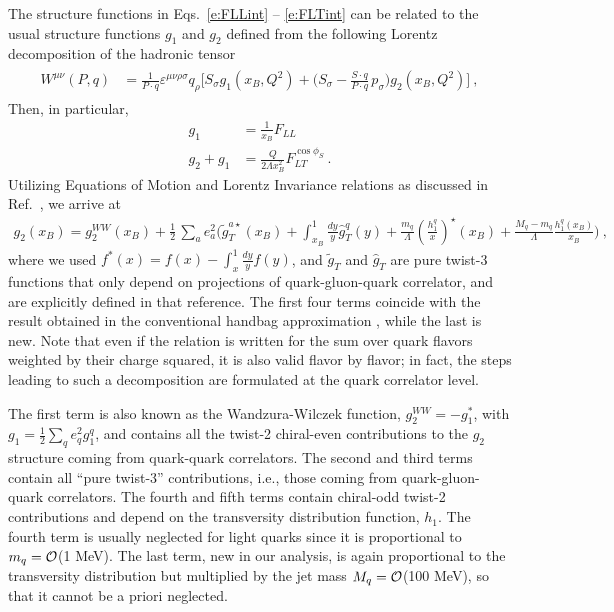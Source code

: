 \documentclass[preprintnumbers,floatfix,nofootinbib]{revtex4}
\newcommand{\xbj}{{x_B}}                   %
\newcommand{\mj}{M_q}
\newcommand{\mq}{m_q}
\begin{document}
The structure functions in Eqs.~\eqref{e:FLLint} -- \eqref{e:FLTint} can be
related to the usual
structure functions $g_1$ and $g_2$ defined from the following Lorentz decomposition of the hadronic tensor
\begin{align}
\begin{split}
W^{\mu\nu}(P,q) 
  & = \frac{1}{P\cdot q} \varepsilon^{\mu\nu\rho\sigma} q_\rho 
  \Big[ S_\sigma g_1(x_B,Q^2) 
    + \Big( S_\sigma - \frac{S\cdot q}{P\cdot q}\, p_\sigma
	\Big) g_2(x_B,Q^2)
  \Big] \ ,
\label{eq:Wmunu}
\end{split}
\end{align}
Then, in particular,
\begin{align}
  g_1 &= \frac{1}{x_B} F_{LL} \\
  g_2+g_1 &= \frac{Q}{2\Lambda x_B^2} F_{LT}^{\cos \phi_S} \ .
\end{align}
Utilizing Equations of Motion and Lorentz Invariance relations as discussed in Ref.~\cite{Accardi:2009au}, we arrive at
\begin{align}
\label{e:g2}
  g_2(\xbj) = g_2^{WW}(\xbj) + \frac{1}{2}\,\sum_a e_a^2
\biggl(
    \widetilde g_T^{a \star}(\xbj) 
    + \int_\xbj^1\frac{dy}{y} \widehat{g}_T^q(y) 
    + \frac{\mq}{\Lambda} \left(\frac{h_1^q}{x}\right)^\star(\xbj) 
    + \frac{\mj-\mq}{\Lambda} \frac{h_1^q(\xbj)}{\xbj} 
\Biggr) \ ,
\end{align}
where we used $f^*(x) = f(x) - \int_x^1\frac{dy}{y} f(y)$, and $\tilde g_T$ and $\hat g_T$ are pure twist-3 functions that only depend on projections of quark-gluon-quark correlator, and are explicitly defined in that reference. The first four terms coincide with the result obtained in the conventional handbag
approximation \cite{Accardi:2009au}, while the last is new. Note that even if
the relation is written for the sum over quark flavors weighted by their charge
squared, it is also valid flavor by flavor; in fact, the steps
leading to such a decomposition are formulated at the quark correlator level.

The first term is also known as the Wandzura-Wilczek function, $g_2^{WW} =
-g_1^*$, with $g_1=\frac12 \sum_q e_q^2 g_1^q$, and contains all the twist-2 chiral-even contributions to the $g_2$ structure coming from quark-quark correlators. The second and third
terms contain all ``pure twist-3'' contributions, i.e., those coming from
quark-gluon-quark correlators. The fourth and fifth terms contain chiral-odd twist-2 contributions and depend on the
transversity distribution function, $h_1$. 
The fourth term is usually neglected for
light quarks since it is proportional to $\mq={\cal O}$(1 MeV). The last term,
new in our analysis, is again proportional to the transversity distribution
but multiplied by the jet mass $\mj={\cal O}$(100 MeV), so that it cannot be a priori neglected.
\end{document}
